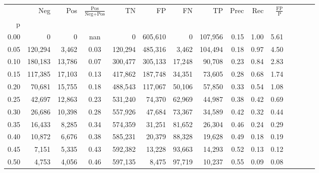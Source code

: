 \begin{tabular}{rrrcrrrrrrrrrrr}
\toprule
{} &      Neg &     Pos & $\frac{\text{Pos}}{\text{Neg}+\text{Pos}}$ &       TN &       FP &       FN &       TP &  Prec &   Rec & $\frac{\text{FP}}{\text{P}}$ \\
p    &          &         &                                            &          &          &          &          &       &       &                              \\
\midrule
0.00 &        0 &       0 &                                        nan &        0 &  605,610 &        0 &  107,956 &  0.15 &  1.00 &                         5.61 \\
0.05 &  120,294 &   3,462 &                                       0.03 &  120,294 &  485,316 &    3,462 &  104,494 &  0.18 &  0.97 &                         4.50 \\
0.10 &  180,183 &  13,786 &                                       0.07 &  300,477 &  305,133 &   17,248 &   90,708 &  0.23 &  0.84 &                         2.83 \\
0.15 &  117,385 &  17,103 &                                       0.13 &  417,862 &  187,748 &   34,351 &   73,605 &  0.28 &  0.68 &                         1.74 \\
0.20 &   70,681 &  15,755 &                                       0.18 &  488,543 &  117,067 &   50,106 &   57,850 &  0.33 &  0.54 &                         1.08 \\
0.25 &   42,697 &  12,863 &                                       0.23 &  531,240 &   74,370 &   62,969 &   44,987 &  0.38 &  0.42 &                         0.69 \\
0.30 &   26,686 &  10,398 &                                       0.28 &  557,926 &   47,684 &   73,367 &   34,589 &  0.42 &  0.32 &                         0.44 \\
0.35 &   16,433 &   8,285 &                                       0.34 &  574,359 &   31,251 &   81,652 &   26,304 &  0.46 &  0.24 &                         0.29 \\
0.40 &   10,872 &   6,676 &                                       0.38 &  585,231 &   20,379 &   88,328 &   19,628 &  0.49 &  0.18 &                         0.19 \\
0.45 &    7,151 &   5,335 &                                       0.43 &  592,382 &   13,228 &   93,663 &   14,293 &  0.52 &  0.13 &                         0.12 \\
0.50 &    4,753 &   4,056 &                                       0.46 &  597,135 &    8,475 &   97,719 &   10,237 &  0.55 &  0.09 &                         0.08 \\

\end{tabular}
